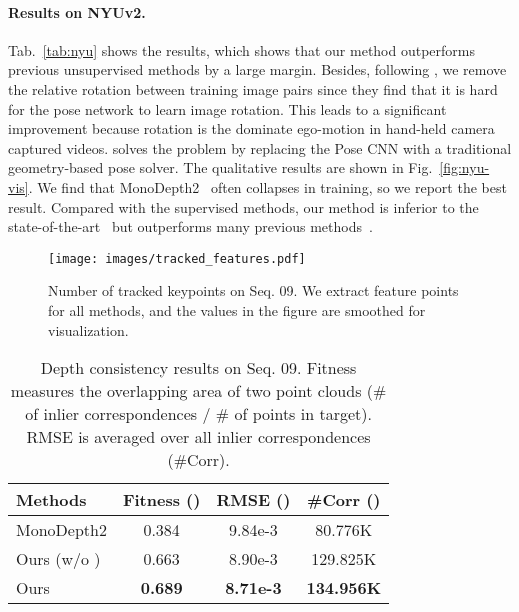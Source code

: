 \documentclass[twocolumn]{svjour3}
\renewcommand{\cite}[1]{\textcolor{blue}{\citep{#1}}}
\newcommand{\figref}[1]{Fig.~\ref{#1}}
\newcommand{\tabref}[1]{Tab.~\ref{#1}}
\begin{document}
\paragraph{Results on NYUv2.}
\tabref{tab:nyu} shows the results, 
which shows that our method outperforms previous unsupervised methods by a large margin.
Besides, following \cite{bian2020unsupervised}, we remove the relative rotation between training image pairs since they find that it is hard for the pose network to learn image rotation.
This leads to a significant improvement because rotation is the dominate ego-motion in hand-held camera captured videos.
\cite{zhao2020towards} solves the problem by replacing the Pose CNN with a traditional geometry-based pose solver.
The qualitative results are shown in \figref{fig:nyu-vis}.
We find that MonoDepth2~\cite{monodepth2} often collapses in training,
so we report the best result.
Compared with the supervised methods, our method is inferior to the state-of-the-art~\cite{Yin2019enforcing} but outperforms many previous methods~\cite{liu2016learning, saxena2006learning,  wang2015towards, eigen2015predicting, chakrabarti2016depth, li2017two}.




\begin{figure}[ht]
\centering
\texttt{[image: images/tracked\_features.pdf]}
\caption{Number of tracked keypoints on Seq. 09. We extract  feature points for all methods, 
and the values in the figure are smoothed for visualization.
}
\label{fig:keypoints}
\end{figure}


\begin{table}[t]
\centering
    \setlength{\tabcolsep}{1.0mm}
    \caption{Depth consistency results on Seq. 09. Fitness measures the overlapping area of two point clouds (\# of inlier correspondences / \# of points in target).
    RMSE is averaged over all inlier correspondences (\#Corr).}
    \label{tab:consistency}
    \begin{tabular}{l | c c c }
     \hline
     Methods & Fitness () & RMSE () & \#Corr () \\
     \hline
    MonoDepth2 & 0.384 & 9.84e-3 & 80.776K \\
    Ours (w/o ) &  0.663 & 8.90e-3 & 129.825K \\  
    Ours & \textbf{0.689} & \textbf{8.71e-3} & \textbf{134.956K} \\  
     \hline
    \end{tabular}
\end{table}
\end{document}
